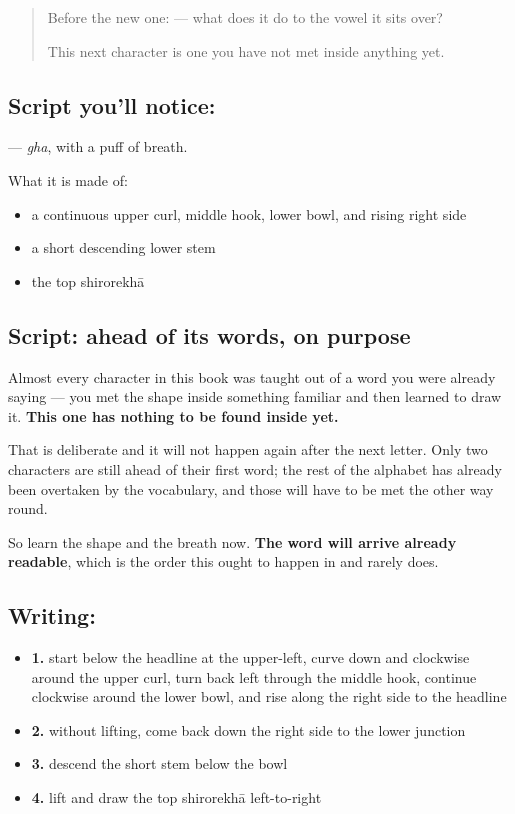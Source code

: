 \label{lesson:HI-S136-letter-gha}



\begin{quote}
Before the new one: \textbf{} — what does it do to the vowel it sits over?

This next character is one you have not met inside anything yet.
\end{quote}

\subsection*{Script you'll notice: }
\textbf{} — \emph{gha}, with a puff of breath.

What it is made of:

\begin{itemize}
\raggedright
  \item a continuous upper curl, middle hook, lower bowl, and rising right side
  \item a short descending lower stem
  \item the top shirorekhā
\end{itemize}

\subsection*{Script: ahead of its words, on purpose}
Almost every character in this book was taught out of a word you were already saying — you met the shape inside something familiar and then learned to draw it. \textbf{This one has nothing to be found inside yet.}

That is deliberate and it will not happen again after the next letter. Only two characters are still ahead of their first word; the rest of the alphabet has already been overtaken by the vocabulary, and those will have to be met the other way round.

So learn the shape and the breath now. \textbf{The word will arrive already readable}, which is the order this ought to happen in and rarely does.

\subsection*{Writing: }

\begin{itemize}
\raggedright
  \item \textbf{1.} start below the headline at the upper-left, curve down and clockwise around the upper curl, turn back left through the middle hook, continue clockwise around the lower bowl, and rise along the right side to the headline
  \item \textbf{2.} without lifting, come back down the right side to the lower junction
  \item \textbf{3.} descend the short stem below the bowl
  \item \textbf{4.} lift and draw the top shirorekhā left-to-right
\end{itemize}

